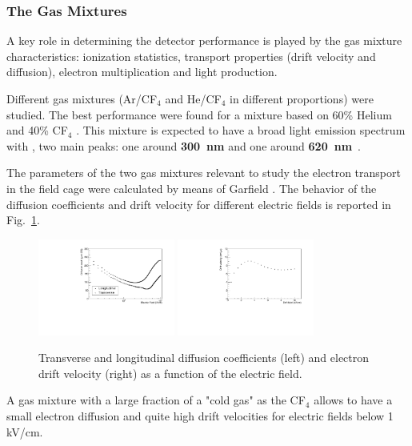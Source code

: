 \documentclass[physics,article,submit,moreauthors,pdftex]{Definitions/mdpi}
\begin{document}
\subsubsection{The Gas Mixtures}

A key role in determining the detector performance is played by the gas mixture characteristics: ionization statistics, transport properties (drift velocity and diffusion), electron multiplication and light production.

Different gas mixtures (Ar/CF$_4$ and He/CF$_{4}$ in different proportions) were studied. The best performance were found for a mixture based on 60\% Helium and 40\% CF$_{4}$ \cite{bib:fe55New}.
This mixture is expected to have a broad light emission spectrum with , two main peaks: one around {\bf 300~nm} and one around {\bf 620~nm}~\cite{bib:Fraga}.


The parameters of the two gas mixtures relevant to study the electron transport in the field cage were calculated
by means of Garfield \cite{bib:garfield1,bib:garfield2}.
The behavior of the diffusion coefficients and drift velocity for different electric fields is reported in Fig.~\ref{fig:diff_vdrift}.

\begin{figure}[ht]
\centering
\includegraphics[width=0.4\textwidth]{diff6040.pdf}
\includegraphics[width=0.4\textwidth]{vdrift6040.pdf}
\caption{Transverse and longitudinal diffusion coefficients (left) and electron drift velocity (right) as a function of the electric field.}
\label{fig:diff_vdrift}
\end{figure}

 A gas mixture with a large fraction of a "cold gas" as the CF$_4$ allows to have a small electron diffusion and quite high drift velocities for electric fields below 1 kV/cm.
 
\end{document}
